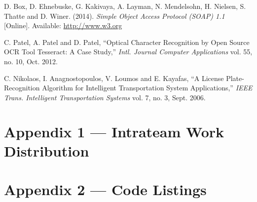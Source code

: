 \documentclass[11pt, oneside, fullpage, doublespace]{article}
\begin{document}
\begin{thebibliography}{99}
 D. Box, D. Ehnebuske, G. Kakivaya, A. Layman, N. Mendelsohn, H. Nielsen, S. Thatte and D. Winer. (2014). \emph{Simple Object Access Protocol (SOAP) 1.1} [Online]. Available: \url{http://www.w3.org}

 C. Patel, A. Patel and D. Patel, ``Optical Character Recognition by Open Source OCR Tool Tesseract: A Case Study,'' \emph{Intl. Journal Computer Applications} vol. 55, no. 10, Oct. 2012.

 C. Nikolaos, I. Anagnostopoulos, V. Loumos and E. Kayafas, ``A License Plate-Recognition Algorithm for Intelligent Transportation System Applications,'' \emph{IEEE Trans. Intelligent Transportation Systems} vol. 7, no. 3, Sept. 2006.

\end{thebibliography}


\section*{Appendix 1 --- Intrateam Work Distribution}


\section*{Appendix 2 --- Code Listings}
\end{document}
